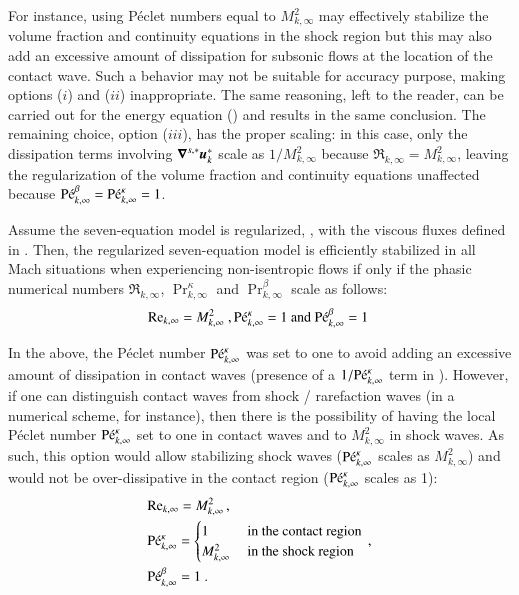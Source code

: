 For instance, using P\'eclet numbers equal to $M_{k,\infty}^2$ may effectively stabilize the volume fraction and continuity 
equations in the shock region but this may also add an excessive amount of dissipation for subsonic 
flows at the location of the contact wave. Such a behavior may not be suitable for accuracy purpose, 
making options ($i$) and ($ii$) inappropriate. The same reasoning, left to the reader, can be carried out 
for the energy equation () and results in the same conclusion. The remaining 
choice, option ($iii$), has the proper scaling: in this case, only the dissipation terms involving 
$\boldsymbol\nabla^{s,*} \boldsymbol u_k^*$ scale as $1/M_{k,\infty}^2$ because $\Re_{k,\infty} = M_{k,\infty}^2$, leaving the 
regularization of the volume fraction and continuity equations unaffected because $\textrm{P\'e}_{k,\infty}^\beta = \textrm{P\'e}_{k,\infty}^\kappa =1$.
%
\begin{lemma}
Assume the seven-equation model is regularized, , with the viscous fluxes defined in . 
Then, the regularized seven-equation model is efficiently stabilized in all Mach situations when experiencing non-isentropic flows if only if the phasic numerical numbers $\Re_{k,\infty}$, $\Pr^\kappa_{k,\infty}$
and $\Pr^\beta_{k,\infty}$ scale as follows:
\begin{align}
\textrm{Re}_{k,\infty} = M_{k,\infty}^2 \ , \textrm{P\'e}_{k,\infty}^\kappa = 1 \text{ and } \textrm{P\'e}_{k,\infty}^\beta = 1\
 \end{align}
\end{lemma}
%
\begin{my_remark}
In the above, the P\'eclet number $\textrm{P\'e}_{k,\infty}^\kappa$ was set to one to avoid adding an excessive amount of dissipation in contact waves
(presence of a $1/\textrm{P\'e}_{k,\infty}^\kappa$ term in \eqt{eq:sev_equ-with-diss-terms-cont_case_one_scaled}). 
However, if one can distinguish contact waves from shock / rarefaction waves (in a numerical scheme, for instance), then there is the possibility of 
having the local P\'eclet number $\textrm{P\'e}_{k,\infty}^\kappa$ set to one in contact waves and to $M^2_{k,\infty}$ in shock waves. 
As such, this option would allow stabilizing shock waves ($\textrm{P\'e}_{k,\infty}^\kappa$ scales as $M^2_{k,\infty}$) and would not be over-dissipative in the 
contact region ($\textrm{P\'e}_{k,\infty}^\kappa$ scales as 1):
%
\begin{align}
&\textrm{Re}_{k,\infty} = M_{k,\infty}^2 \,, \nonumber \\ 
& \textrm{P\'e}_{k,\infty}^\kappa = 
\begin{cases} 
1              & \text{ in the contact region} \\
M^2_{k,\infty} & \text{ in the shock region } 
\end{cases} \,,\nonumber \\ 
&\textrm{P\'e}_{k,\infty}^\beta = 1 \ . \nonumber
\end{align}
%
\end{my_remark}
%
